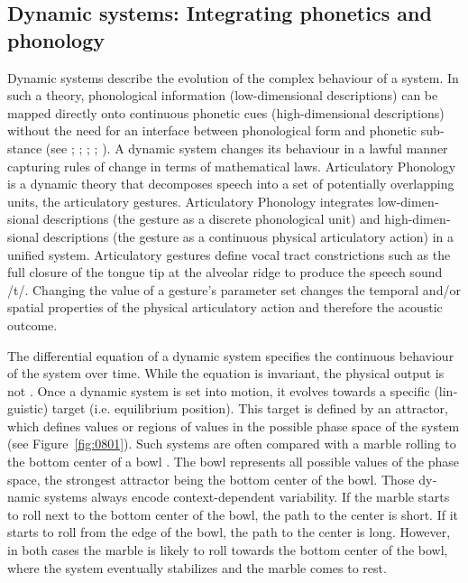 \begin{otherlanguage}{english}
\section{Dynamic systems: Integrating phonetics and phonology}
\label{sec:0801}
Dynamic systems describe the evolution of the complex behaviour of a system. In such a theory, phonological information (low-dimensional descriptions) can be mapped directly onto continuous phonetic cues (high-dimensional descriptions) without the need for an interface between phonological form and phonetic substance (see \citealt{Browman1992a}; \citealt{Gafos2006}; \citealt{Goldstein2006}; \citealt{Mücke2014c}; \citealt{Mücke2017}). %
A dynamic system changes its behaviour in a lawful manner capturing rules of change in terms of mathematical laws. Articulatory Phonology \citep{Browman1992a} is a dynamic theory that decomposes speech into a set of potentially overlapping units, the articulatory gestures. Articulatory Phonology integrates low-dimensional descriptions (the gesture as a discrete phonological unit) and high-dimensional descriptions (the gesture as a continuous physical articulatory action) in a unified system. Articulatory gestures define vocal tract constrictions such as the full closure of the tongue tip at the alveolar ridge to produce the speech sound /t/. Changing the value of a gesture’s parameter set changes the temporal and/or spatial properties of the physical articulatory action and therefore the acoustic outcome.

The differential equation of a dynamic system specifies the continuous behaviour of the system over time. While the equation is invariant, the physical output is not \citep[see][]{Browman1989, Browman1992a, Kelso1995, Gafos2006, Spivey2007, Gafos2014, Mücke2017}. Once a dynamic system is set into motion, it evolves towards a specific (linguistic) target (i.e. equilibrium position). This target is defined by an attractor, which defines values or regions of values in the possible phase space of the system (see Figure~\ref{fig:0801}). Such systems are often compared with a marble rolling to the bottom center of a bowl \citep{Haken1985, Nam2009b}. The bowl represents all possible values of the phase space, the strongest attractor being the bottom center of the bowl. Those dynamic systems always encode context-dependent variability. If the marble starts to roll next to the bottom center of the bowl, the path to the center is short. If it starts to roll from the edge of the bowl, the path to the center is long. However, in both cases the marble is likely to roll towards the bottom center of the bowl, where the system eventually stabilizes and the marble comes to rest. 


\end{otherlanguage}
